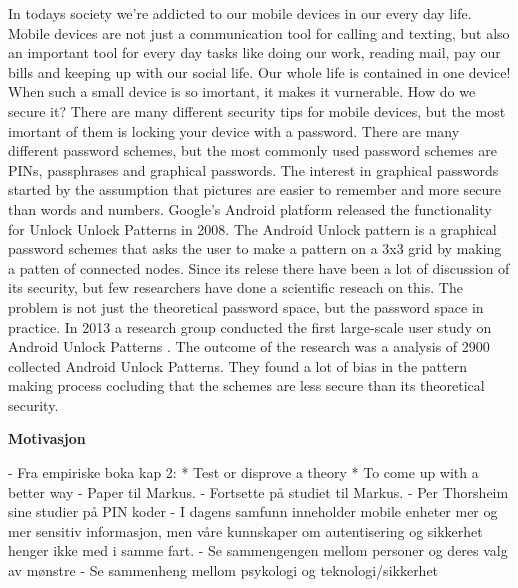   In todays society we're addicted to our mobile devices in our every day life. Mobile devices are not just a communication tool for calling and texting, but also an important tool for every day tasks like doing our work, reading mail, pay our bills and keeping up with our social life. Our whole life is contained in one device! When such a small device is so imortant, it makes it vurnerable. How do we secure it?
  There are many different security tips for mobile devices, but the most imortant of them is locking your device with a password. There are many different password schemes, but the most commonly used password schemes are PINs, passphrases and graphical passwords.
  The interest in graphical passwords started by the assumption that pictures are easier to remember and more secure than words and numbers. Google's Android platform released the  functionality for Unlock Unlock Patterns in 2008. The Android Unlock pattern is a graphical password schemes that asks the user to make a pattern on a 3x3 grid by making a patten of connected nodes. Since its relese there have been a lot of discussion of its security, but few researchers have done a scientific reseach on this. The problem is not just the theoretical password space, but the password space in practice.
  In 2013 a research group conducted the first large-scale user study on Android Unlock Patterns \cite{Uellenbeck}. The outcome of the research was a analysis of 2900 collected Android Unlock Patterns. They found a lot of bias in the pattern making process cocluding that the schemes are less secure than its theoretical security.

  {\bf Motivasjon}

  - Fra empiriske boka kap 2: 
    * Test or disprove a theory
    * To come up with a better way
  - Paper til Markus.
  - Fortsette på studiet til Markus. 
  - Per Thorsheim sine studier på PIN koder
  - I dagens samfunn inneholder mobile enheter mer og mer sensitiv informasjon, 
    men våre kunnskaper om autentisering og sikkerhet henger ikke med i samme fart. 
  - Se sammengengen mellom personer og deres valg av mønstre
  - Se sammenheng mellom psykologi og teknologi/sikkerhet

